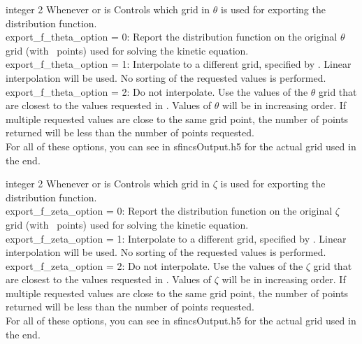 {integer}
{2}
{Whenever  or  is \true}
{Controls which grid in $\theta$ is used for exporting the distribution function.\\

{\ttfamily export\_f\_theta\_option} = 0: Report the distribution function on the original $\theta$ grid (with \Ntheta~points) used for solving the kinetic equation.\\

{\ttfamily export\_f\_theta\_option} = 1: Interpolate to a different grid, specified by . Linear interpolation will be used.
No sorting of the requested values is performed.\\

{\ttfamily export\_f\_theta\_option} = 2: Do not interpolate. Use the
values of the $\theta$ grid that are closest to the values requested
in .  Values of $\theta$ will be in
increasing order. If multiple requested values are close to the same
grid point, the number of points returned will be less than the number
of points requested. \\

For all of these options, you can see  in {\ttfamily sfincsOutput.h5} for the actual grid used in the end.
}

\myhrule

{integer}
{2}
{Whenever  or  is \true}
{Controls which grid in $\zeta$ is used for exporting the distribution function.\\

{\ttfamily export\_f\_zeta\_option} = 0: Report the distribution function on the original $\zeta$ grid (with \Nzeta~points) used for solving the kinetic equation.\\

{\ttfamily export\_f\_zeta\_option} = 1: Interpolate to a different grid, specified by . Linear interpolation will be used.
No sorting of the requested values is performed.\\

{\ttfamily export\_f\_zeta\_option} = 2: Do not interpolate. Use the
values of the $\zeta$ grid that are closest to the values requested
in .  Values of $\zeta$ will be in
increasing order. If multiple requested values are close to the same
grid point, the number of points returned will be less than the number
of points requested. \\

For all of these options, you can see  in {\ttfamily sfincsOutput.h5} for the actual grid used in the end.
}

